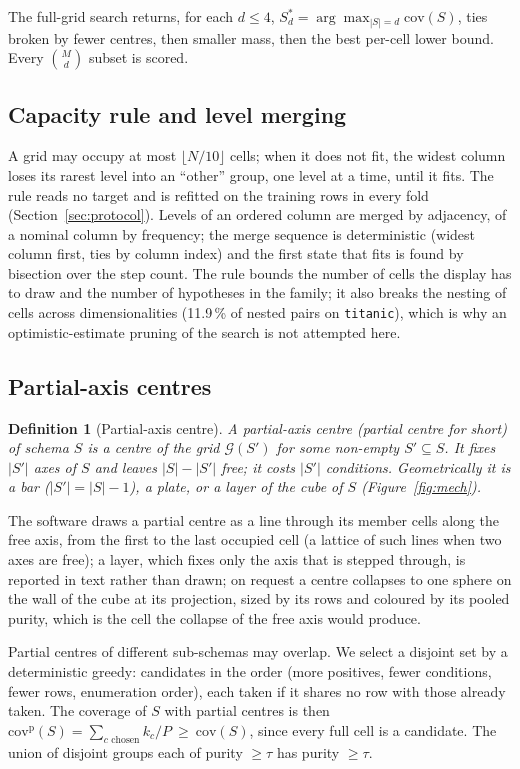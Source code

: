 \documentclass[11pt]{article}
\newtheorem{definition}{Definition}
\newcommand{\cov}{\mathrm{cov}}
\begin{document}
The full-grid search returns, for each $d\le 4$, $S^*_d=\arg\max_{|S|=d}\cov(S)$, ties broken by fewer centres, then smaller mass, then the best per-cell lower bound. Every $\binom{M}{d}$ subset is scored.

\subsection{Capacity rule and level merging}\label{sec:capacity}
A grid may occupy at most $\lfloor N/10\rfloor$ cells; when it does not fit, the widest column loses its rarest level into an ``other'' group, one level at a time, until it fits. The rule reads no target and is refitted on the training rows in every fold (Section~\ref{sec:protocol}). Levels of an ordered column are merged by adjacency, of a nominal column by frequency; the merge sequence is deterministic (widest column first, ties by column index) and the first state that fits is found by bisection over the step count. The rule bounds the number of cells the display has to draw and the number of hypotheses in the family; it also breaks the nesting of cells across dimensionalities (11.9\,\% of nested pairs on \texttt{titanic}), which is why an optimistic-estimate pruning of the search is not attempted here.

\subsection{Partial-axis centres}\label{sec:partial}
\begin{definition}[Partial-axis centre]
A partial-axis centre (\emph{partial centre} for short) of schema $S$ is a centre of the grid $\mathcal{G}(S')$ for some non-empty $S'\subseteq S$. It fixes $|S'|$ axes of $S$ and leaves $|S|-|S'|$ free; it costs $|S'|$ conditions. Geometrically it is a bar ($|S'|=|S|-1$), a plate, or a layer of the cube of $S$ (Figure~\ref{fig:mech}).
\end{definition}

The software draws a partial centre as a line through its member cells along the free axis, from the first to the last occupied cell (a lattice of such lines when two axes are free); a layer, which fixes only the axis that is stepped through, is reported in text rather than drawn; on request a centre collapses to one sphere on the wall of the cube at its projection, sized by its rows and coloured by its pooled purity, which is the cell the collapse of the free axis would produce.

Partial centres of different sub-schemas may overlap. We select a disjoint set by a deterministic greedy: candidates in the order (more positives, fewer conditions, fewer rows, enumeration order), each taken if it shares no row with those already taken. The coverage of $S$ with partial centres is then $\cov^{\mathrm{p}}(S)=\sum_{c\text{ chosen}}k_c/P\ \ge\ \cov(S)$, since every full cell is a candidate. The union of disjoint groups each of purity $\ge\tau$ has purity $\ge\tau$.
\end{document}
